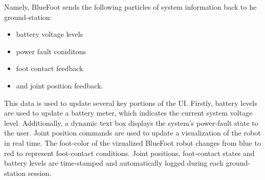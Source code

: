 	Namely, BlueFoot sends the following particles of system information back to he ground-station: 
	\begin{itemize}
		\item battery voltage levels 
		\item power fault coniditons 
		\item foot contact feedback
		\item and joint position feedback. 
	\end{itemize}
	This data is used to update several key portions of the UI. Firstly, battery levels are used to update a battery meter, which indicates the current system voltage level. Additionally, a dynamic text box displays the system's power-fault state to the user. Joint position commands are used to update a visualization of the robot in real time. The foot-color of the vizualized BlueFoot robot changes from blue to red to represent foot-contact conditions. Joint positions, foot-contact states and battery levels are time-stamped and automatically logged during each ground-station session. 

